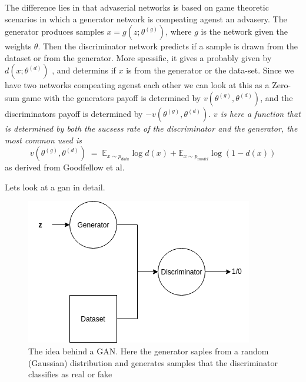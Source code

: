 The difference lies in that advaserial networks is based on game theoretic scenarios in which a generator network is compeating agenst an advasery. 
The generator produces samples $x=g(z;\theta^{(g)})$, where $g$ is the network given the weights $\theta$. Then the discriminator network predicts if a sample is drawn from the dataset or from the generator.
More spessific, it gives a probably given by $d(x;\theta^{(d)})$ , and determins if $x$ is from the generator or the data-set. 
Since we have two networks compeating agenst each other we can look at this as a Zero-sum game with the generators payoff is determined by $v(\theta^{(g)},\theta^{(d)})$, and the discriminators payoff is determined by $-v(\theta^{(g)},\theta^{(d)})$.
\textit{$v$ is here a function that is determined by both the sucsess rate of the discriminator and the generator, the most common used is}
\begin{equation} %
	v(\theta^{(g)},\theta^{(d)}) \; = \; \mathds{E}_{x\sim p_{data}}\log{d(x)} + \mathds{E}_{x\sim p_{model}}\log{(1 - d(x))} 
\end{equation}
as derived from Goodfellow et al. %
	  
Lets look at a gan in detail. \\
\begin{figure}[ht!]
	\centering
	\includegraphics[scale=0.5]{background/figures/simpleGAN.png}
	\caption{The idea behind a GAN. Here the generator saples from a random (Gaussian) distribution and generates samples that the discriminator classifies as real or fake}
\end{figure}
	

